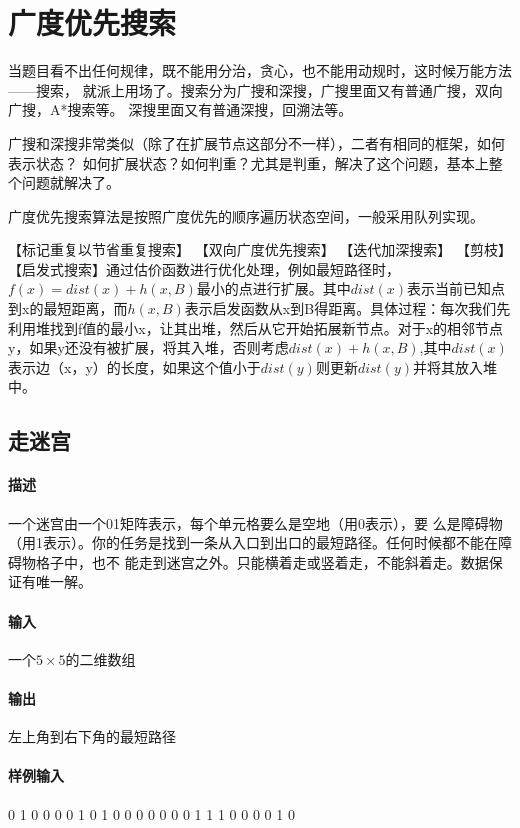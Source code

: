 \chapter{广度优先搜索}
当题目看不出任何规律，既不能用分治，贪心，也不能用动规时，这时候万能方法——搜索，
就派上用场了。搜索分为广搜和深搜，广搜里面又有普通广搜，双向广搜，A*搜索等。
深搜里面又有普通深搜，回溯法等。

广搜和深搜非常类似（除了在扩展节点这部分不一样），二者有相同的框架，如何表示状态？
如何扩展状态？如何判重？尤其是判重，解决了这个问题，基本上整个问题就解决了。

广度优先搜索算法是按照广度优先的顺序遍历状态空间，一般采用队列实现。

【标记重复以节省重复搜索】
【双向广度优先搜索】
【迭代加深搜索】
【剪枝】
【启发式搜索】通过估价函数进行优化处理，例如最短路径时，$f(x)=dist(x)+h(x,B)$最小的点进行扩展。其中$dist(x)$表示当前已知点到x的最短距离，而$h(x,B)$表示启发函数从x到B得距离。具体过程：每次我们先利用堆找到f值的最小x，让其出堆，然后从它开始拓展新节点。对于x的相邻节点y，如果y还没有被扩展，将其入堆，否则考虑$dist(x)+h(x,B)$,其中$dist(x)$表示边（x，y）的长度，如果这个值小于$dist(y)$则更新$dist(y)$并将其放入堆中。
\section{走迷宫} %

\subsubsection{描述}
一个迷宫由一个01矩阵表示，每个单元格要么是空地（用0表示），要
么是障碍物（用1表示）。你的任务是找到一条从入口到出口的最短路径。任何时候都不能在障碍物格子中，也不
能走到迷宫之外。只能横着走或竖着走，不能斜着走。数据保证有唯一解。

\subsubsection{输入}
一个$5 \times 5$的二维数组

\subsubsection{输出}
左上角到右下角的最短路径

\subsubsection{样例输入}
\begin{Code}
0 1 0 0 0
0 1 0 1 0
0 0 0 0 0
0 1 1 1 0
0 0 0 1 0
\end{Code}

